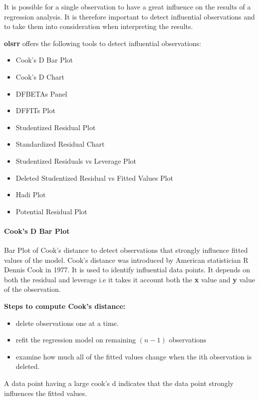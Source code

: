 \documentclass[
]{article}
\providecommand{\tightlist}{%
  \setlength{\itemsep}{0pt}\setlength{\parskip}{0pt}}
\begin{document}
It is possible for a single observation to have a great influence on the
results of a regression analysis. It is therefore important to detect
influential observations and to take them into consideration when
interpreting the results.

\textbf{olsrr} offers the following tools to detect influential
observations:

\begin{itemize}
\tightlist
\item
  Cook's D Bar Plot
\item
  Cook's D Chart
\item
  DFBETAs Panel
\item
  DFFITs Plot
\item
  Studentized Residual Plot
\item
  Standardized Residual Chart
\item
  Studentized Residuals vs Leverage Plot
\item
  Deleted Studentized Residual vs Fitted Values Plot
\item
  Hadi Plot
\item
  Potential Residual Plot
\end{itemize}

\hypertarget{cooks-d-bar-plot}{%
\paragraph{Cook's D Bar Plot}\label{cooks-d-bar-plot}}

Bar Plot of Cook's distance to detect observations that strongly
influence fitted values of the model. Cook's distance was introduced by
American statistician R Dennis Cook in 1977. It is used to identify
influential data points. It depends on both the residual and leverage
i.e it takes it account both the \textbf{x} value and \textbf{y} value
of the observation.

\textbf{Steps to compute Cook's distance:}

\begin{itemize}
\tightlist
\item
  delete observations one at a time.
\item
  refit the regression model on remaining \((n - 1)\) observations
\item
  examine how much all of the fitted values change when the ith
  observation is deleted.
\end{itemize}

A data point having a large cook's d indicates that the data point
strongly influences the fitted values.
\end{document}
